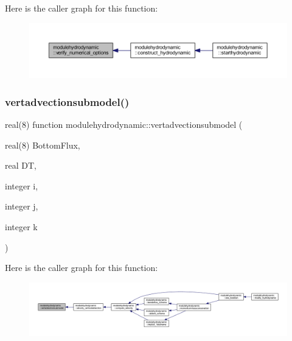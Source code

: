 Here is the caller graph for this function\+:\nopagebreak
\begin{figure}[H]
\begin{center}
\leavevmode
\includegraphics[width=350pt]{namespacemodulehydrodynamic_a7c3dd39beec17720b08c54e61c02ecc8_icgraph}
\end{center}
\end{figure}
\mbox{\label{namespacemodulehydrodynamic_a514294a37adf9ce3b21a6817c7a86ae1}} 
\subsubsection{\texorpdfstring{vertadvectionsubmodel()}{vertadvectionsubmodel()}}
{\footnotesize\ttfamily real(8) function modulehydrodynamic\+::vertadvectionsubmodel (\begin{DoxyParamCaption}\item[{real(8)}]{Bottom\+Flux,  }\item[{real}]{DT,  }\item[{integer}]{i,  }\item[{integer}]{j,  }\item[{integer}]{k }\end{DoxyParamCaption})\hspace{0.3cm}{\ttfamily [private]}}

Here is the caller graph for this function\+:\nopagebreak
\begin{figure}[H]
\begin{center}
\leavevmode
\includegraphics[width=350pt]{namespacemodulehydrodynamic_a514294a37adf9ce3b21a6817c7a86ae1_icgraph}
\end{center}
\end{figure}
\mbox{\label{namespacemodulehydrodynamic_aa70939d9e325f64455a339e7369d5b4c}} 
